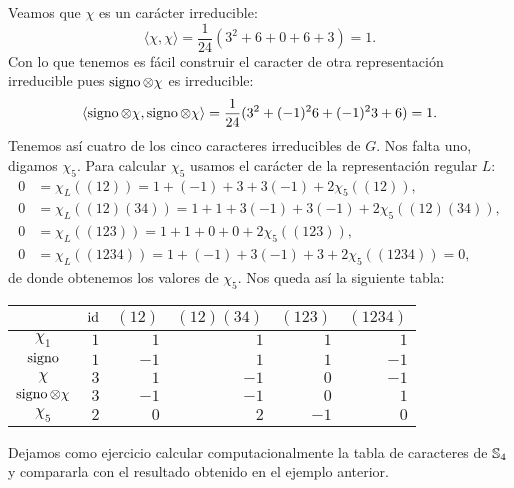 \begin{example}
	Veamos que $\chi$ es un carácter irreducible: 
	\[
		\langle \chi,\chi\rangle=\frac{1}{24}(3^2+6+0+6+3)=1.
	\]
	Con lo que tenemos es fácil construir el caracter de otra representación irreducible pues
	$\operatorname{signo}\otimes\chi$ es irreducible:
	\[
		\langle \operatorname{signo}\otimes\chi,\operatorname{signo}\otimes\chi\rangle=\frac{1}{24}(3^2+(-1)^26+(-1)^23+6)=1.
	\]
	Tenemos así cuatro de los cinco caracteres irreducibles de $G$. Nos falta
	uno, digamos $\chi_5$.  Para calcular $\chi_5$ usamos el carácter de la
	representación regular $L$:
	\begin{align*}
		0 &= \chi_L\left( (12) \right)=1+(-1)+3+3(-1)+2\chi_5\left( (12) \right),\\
		0 &= \chi_L\left( (12)(34) \right)=1+1+3(-1)+3(-1)+2\chi_5\left( (12)(34) \right),\\
		0 &= \chi_L\left( (123) \right)=1+1+0+0+2\chi_5\left( (123) \right),\\
		0 &= \chi_L\left( (1234) \right)=1+(-1)+3(-1)+3+2\chi_5\left( (1234) \right)=0,
	\end{align*}
	de donde obtenemos los valores de $\chi_5$. Nos queda así la siguiente tabla:
	\begin{center}
		\begin{tabular}{|c|rrrrr|}
			\hline
			& $\operatorname{id}$ & $(12)$ & $(12)(34)$ & $(123)$ & $(1234)$\tabularnewline
			\hline
			$\chi_1$ & $1$ & $1$ & $1$ & $1$ & $1$\tabularnewline
			$\operatorname{signo}$ & $1$ & $-1$ & $1$ & $1$ & $-1$\tabularnewline
			$\chi$ & $3$ & $1$ & $-1$ & $0$ & $-1$\tabularnewline
			$\operatorname{signo}\otimes\chi$ & $3$ & $-1$ & $-1$ & $0$ & $1$\tabularnewline
			$\chi_5$ & $2$ & $0$ & $2$ & $-1$ & $0$\tabularnewline
			\hline
		\end{tabular}
	\end{center}



\end{example}

Dejamos como ejercicio calcular computacionalmente 
la tabla de caracteres de $\mathbb{S}_4$ y compararla con el resultado obtenido en el ejemplo anterior. 

